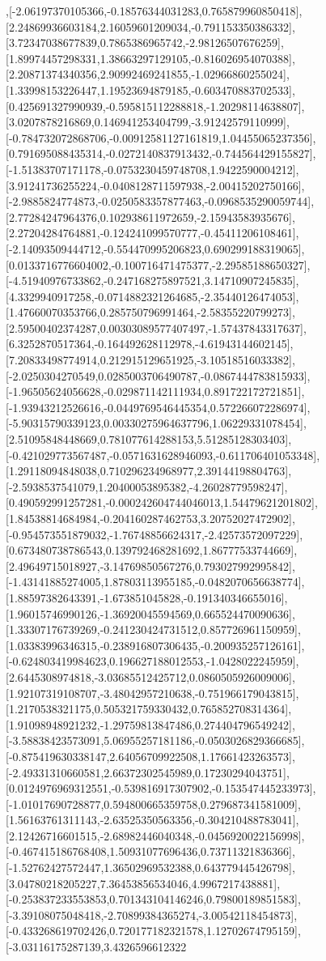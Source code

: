 \documentclass{article}
\begin{document}
,[-2.06197370105366,-0.18576344031283,0.765879960850418],[2.24869936603184,2.16059601209034,-0.791153350386332],[3.72347038677839,0.7865386965742,-2.98126507676259],[1.89974457298331,1.38663297129105,-0.816026954070388],[2.20871374340356,2.90992469241855,-1.02966860255024],[1.33998153226447,1.19523694879185,-0.603470883702533],[0.425691327990939,-0.595815112288818,-1.20298114638807],[3.0207878216869,0.146941253404799,-3.91242579110999],[-0.784732072868706,-0.00912581127161819,1.04455065237356],[0.791695088435314,-0.0272140837913432,-0.744564429155827],[-1.51383707171178,-0.0753230459748708,1.9422590004212],[3.91241736255224,-0.0408128711597938,-2.00415202750166],[-2.9885824774873,-0.0250583357877463,-0.0968535290059744],[2.77284247964376,0.102938611972659,-2.15943583935676],[2.27204284764881,-0.124241099570777,-0.45411206108461],[-2.14093509444712,-0.554470995206823,0.690299188319065],[0.0133716776604002,-0.100716471475377,-2.29585188650327],[-4.51940976733862,-0.247168275897521,3.14710907245835],[4.3329940917258,-0.0714882321264685,-2.35440126474053],[1.47660070353766,0.285750796991464,-2.58355220799273],[2.59500402374287,0.00303089577407497,-1.57437843317637],[6.3252870517364,-0.164492628112978,-4.61943144602145],[7.20833498774914,0.212915129651925,-3.10518516033382],[-2.0250304270549,0.0285003706490787,-0.0867444783815933],[-1.96505624056628,-0.029871142111934,0.891722172721851],[-1.93943212526616,-0.0449769546445354,0.572266072286974],[-5.90315790339123,0.00330275964637796,1.06229331078454],[2.51095848448669,0.781077614288153,5.51285128303403],[-0.421029773567487,-0.0571631628946093,-0.611706401053348],[1.29118094848038,0.710296234968977,2.39144198804763],[-2.5938537541079,1.20400053895382,-4.26028779598247],[0.490592991257281,-0.000242604744046013,1.54479621201802],[1.84538814684984,-0.204160287462753,3.20752027472902],[-0.954573551879032,-1.76748856624317,-2.42573572097229],[0.673480738786543,0.139792468281692,1.86777533744669],[2.49649715018927,-3.14769850567276,0.793027992995842],[-1.43141885274005,1.87803113955185,-0.0482070656638774],[1.88597382643391,-1.673851045828,-0.191340346655016],[1.96015746990126,-1.36920045594569,0.665524470090636],[1.33307176739269,-0.241230424731512,0.857726961150959],[1.03383996346315,-0.238916807306435,-0.200935257126161],[-0.624803419984623,0.196627188012553,-1.0428022245959],[2.6445308974818,-3.03685512425712,0.0860505926009006],[1.92107319108707,-3.48042957210638,-0.751966179043815],[1.2170538321175,0.505321759330432,0.765852708314364],[1.91098948921232,-1.29759813847486,0.274404796549242],[-3.58838423573091,5.06955257181186,-0.0503026829366685],[-0.875419630338147,2.64056709922508,1.17661423263573],[-2.49331310660581,2.66372302545989,0.17230294043751],[0.0124976969312551,-0.539816917307902,-0.153547445233973],[-1.01017690728877,0.594800665359758,0.279687341581009],[1.56163761311143,-2.63525350563356,-0.304210488783041],[2.12426716601515,-2.68982446040348,-0.0456920022156998],[-0.467415186768408,1.50931077696436,0.73711321836366],[-1.52762427572447,1.36502969532388,0.643779445426798],[3.04780218205227,7.36453856534046,4.9967217438881],[-0.253837233553853,0.701343104146246,0.79800189851583],[-3.39108075048418,-2.70899384365274,-3.00542118454873],[-0.433268619702426,0.720177182321578,1.12702674795159],[-3.03116175287139,3.4326596612322
\end{document}
